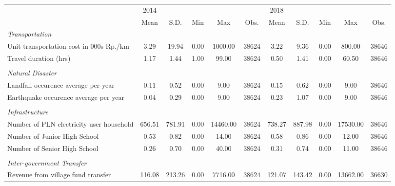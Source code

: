 \begin{tabular}{l*{2}{ccccc}}
\toprule
                &     2014&         &         &         &         &     2018&         &         &         &         \\
                &     Mean&     S.D.&      Min&      Max&     Obs.&     Mean&     S.D.&      Min&      Max&     Obs.\\
\midrule
\emph{Transportation}&         &         &         &         &         &         &         &         &         &         \\
\hspace{0.25cm} Unit transportation cost in 000s Rp./km&     3.29&    19.94&     0.00&  1000.00&    38624&     3.22&     9.36&     0.00&   800.00&    38646\\
\hspace{0.25cm} Travel duration (hrs)&     1.17&     1.44&     1.00&    99.00&    38624&     0.50&     1.41&     0.00&    60.50&    38646\\
\vspace{0.05em} \\ \emph{Natural Disaster}&         &         &         &         &         &         &         &         &         &         \\
\hspace{0.25cm} Landfall occurence average per year&     0.11&     0.52&     0.00&     9.00&    38624&     0.15&     0.62&     0.00&     9.00&    38646\\
\hspace{0.25cm} Earthquake occurence average per year&     0.04&     0.29&     0.00&     9.00&    38624&     0.23&     1.07&     0.00&     9.00&    38646\\
\vspace{0.05em} \\ \emph{Infrastructure}&         &         &         &         &         &         &         &         &         &         \\
\hspace{0.25cm} Number of PLN electricity user household&   656.51&   781.91&     0.00& 14460.00&    38624&   738.27&   887.98&     0.00& 17530.00&    38646\\
\hspace{0.25cm} Number of Junior High School&     0.53&     0.82&     0.00&    14.00&    38624&     0.58&     0.86&     0.00&    12.00&    38646\\
\hspace{0.25cm} Number of Senior High School&     0.26&     0.70&     0.00&    40.00&    38624&     0.31&     0.74&     0.00&    11.00&    38646\\
\vspace{0.05em} \\ \emph{Inter-government Transfer}&         &         &         &         &         &         &         &         &         &         \\
\hspace{0.25cm} Revenue from village fund transfer&   116.08&   213.26&     0.00&  7716.00&    38624&   121.07&   143.42&     0.00& 13662.00&    36630\\
\bottomrule
\end{tabular}
